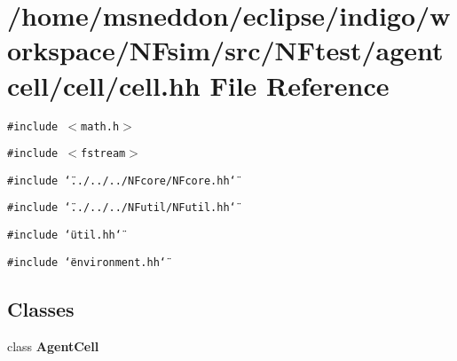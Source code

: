 \section{/home/msneddon/eclipse/indigo/workspace/NFsim/src/NFtest/agentcell/cell/cell.hh File Reference}
\label{cell_8hh}


{\tt \#include $<$math.h$>$}\par
{\tt \#include $<$fstream$>$}\par
{\tt \#include \char`\"{}../../../NFcore/NFcore.hh\char`\"{}}\par
{\tt \#include \char`\"{}../../../NFutil/NFutil.hh\char`\"{}}\par
{\tt \#include \char`\"{}util.hh\char`\"{}}\par
{\tt \#include \char`\"{}environment.hh\char`\"{}}\par
\subsection*{Classes}
\begin{CompactItemize}
\item 
class {\bf AgentCell}
\end{CompactItemize}

